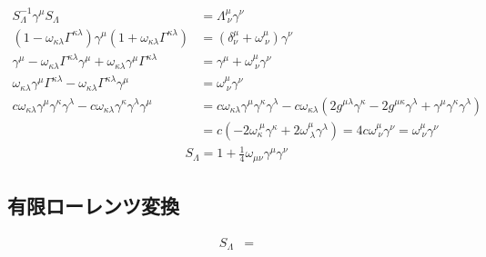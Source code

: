 \documentclass[uplatex,dvipdfmx,a4paper,11pt]{jlreq}
\theoremstyle{definition}
\numberwithin{equation}{section}
\begin{document}
\begin{align}
  S_\Lambda^{-1}\gamma^\mu S_\Lambda                                                                                           & = \Lambda^\mu_{\ \nu}\gamma^\nu                                                                                                                                                               \\
  (1 - \omega_{\kappa\lambda}\Gamma^{\kappa\lambda})\gamma^\mu(1 + \omega_{\kappa\lambda}\Gamma^{\kappa\lambda})               & = (\delta^\mu_\nu + \omega^\mu_{\ \nu})\gamma^\nu                                                                                                                                             \\
  \gamma^\mu - \omega_{\kappa\lambda}\Gamma^{\kappa\lambda}\gamma^\mu + \omega_{\kappa\lambda}\gamma^\mu\Gamma^{\kappa\lambda} & = \gamma^\mu + \omega^\mu_{\ \nu}\gamma^\nu                                                                                                                                                   \\
  \omega_{\kappa\lambda}\gamma^\mu\Gamma^{\kappa\lambda} - \omega_{\kappa\lambda}\Gamma^{\kappa\lambda}\gamma^\mu              & = \omega^\mu_{\ \nu}\gamma^\nu                                                                                                                                                                \\
  c\omega_{\kappa\lambda}\gamma^\mu\gamma^\kappa\gamma^\lambda - c\omega_{\kappa\lambda}\gamma^\kappa\gamma^\lambda\gamma^\mu  & = c\omega_{\kappa\lambda}\gamma^\mu\gamma^\kappa\gamma^\lambda - c\omega_{\kappa\lambda}(2g^{\mu\lambda}\gamma^\kappa - 2g^{\mu\kappa}\gamma^\lambda + \gamma^\mu\gamma^\kappa\gamma^\lambda) \\
                                                                                                                               & = c(-2\omega_{\kappa}^{\ \mu}\gamma^\kappa + 2\omega^\mu_{\ \lambda}\gamma^\lambda) = 4c\omega_{\ \nu}^{\mu}\gamma^\nu = \omega^\mu_{\ \nu}\gamma^\nu
\end{align}
\begin{align}
  S_\Lambda = 1 + \frac{1}{4}\omega_{\mu\nu}\gamma^\mu\gamma^\nu
\end{align}



\subsection{有限ローレンツ変換}
\begin{align}
  S_\Lambda & =
\end{align}
\end{document}
